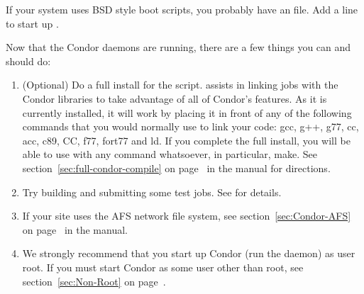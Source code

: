 If your system uses BSD style boot scripts, you probably have an
 file.  Add a line to start up
.


Now that the Condor daemons are running, there are a few things you
can and should do:

\begin{enumerate}
\item (Optional) Do a full install for the  script.
     assists in linking jobs with the Condor libraries
    to take advantage of all of Condor's features.  As it is currently
    installed, it will work by placing it in front of any of the
    following commands that you would normally use to link your code:
    gcc, g++, g77, cc, acc, c89, CC, f77, fort77 and ld.  If you
    complete the full install, you will be able to use
     with any command whatsoever, in particular, make.
    See section~\ref{sec:full-condor-compile} on
    page~\pageref{sec:full-condor-compile} in the manual for
    directions.

\item Try building and submitting some test jobs.  See
     for details.

\item If your site uses the AFS network file system, see
section~\ref{sec:Condor-AFS} on page~\pageref{sec:Condor-AFS} in the
manual.

\item We strongly recommend that you start up Condor (run the
 daemon) as user root.  If you must start Condor as
some user other than root, see section~\ref{sec:Non-Root} on
page~\pageref{sec:Non-Root}.

\end{enumerate}


